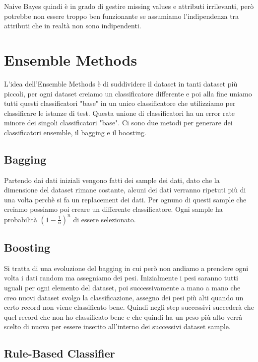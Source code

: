 \documentclass[14pt]{extreport}
\begin{document}
Naive Bayes quindi è in grado di gestire missing values e attributi irrilevanti, però potrebbe non essere troppo ben funzionante se assumiamo l'indipendenza tra attributi che in realtà non sono indipendenti.

\section{Ensemble Methods}

L'idea dell'Ensemble Methods è di suddividere il dataset in tanti dataset più piccoli, per ogni dataset creiamo un classificatore differente e poi alla fine uniamo tutti questi classificatori "base" in un unico classificatore che utilizziamo per classificare le istanze di test. 
Questa unione di classificatori ha un error rate minore dei singoli classificatori "base".
Ci sono due metodi per generare dei classificatori ensemble, il bagging e il boosting.

\subsection{Bagging}

Partendo dai dati iniziali vengono fatti dei sample dei dati, dato che la dimensione del dataset rimane costante, alcuni dei dati verranno ripetuti più di una volta perchè si fa un replacement dei dati.
Per ognuno di questi sample che creiamo possiamo poi creare un differente classificatore.
Ogni sample ha probabilità $(1-\frac{1}{n})^n$ di essere selezionato.

\subsection{Boosting}

Si tratta di una evoluzione del bagging in cui però non andiamo a prendere ogni volta i dati random ma assegniamo dei pesi. 
Inizialmente i pesi saranno tutti uguali per ogni elemento del dataset, poi successivamente a mano a mano che creo nuovi dataset svolgo la classificazione, assegno dei pesi più alti quando un certo record non viene classificato bene.
Quindi negli step successivi succederà che quel record che non ho classificato bene e che quindi ha un peso più alto verrà scelto di nuovo per essere inserito all'interno dei successivi dataset sample.

\subsection{Rule-Based Classifier}
\end{document}

